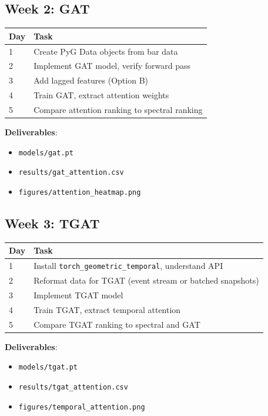 \documentclass[11pt, a4paper]{article}
\begin{document}
\subsection{Week 2: GAT}

\begin{center}
\begin{tabular}{lp{10cm}}
\toprule
\textbf{Day} & \textbf{Task} \\
\midrule
1 & Create PyG Data objects from bar data \\
2 & Implement GAT model, verify forward pass \\
3 & Add lagged features (Option B) \\
4 & Train GAT, extract attention weights \\
5 & Compare attention ranking to spectral ranking \\
\bottomrule
\end{tabular}
\end{center}

\textbf{Deliverables}:
\begin{itemize}
    \item \texttt{models/gat.pt}
    \item \texttt{results/gat\_attention.csv}
    \item \texttt{figures/attention\_heatmap.png}
\end{itemize}

\subsection{Week 3: TGAT}

\begin{center}
\begin{tabular}{lp{10cm}}
\toprule
\textbf{Day} & \textbf{Task} \\
\midrule
1 & Install \texttt{torch\_geometric\_temporal}, understand API \\
2 & Reformat data for TGAT (event stream or batched snapshots) \\
3 & Implement TGAT model \\
4 & Train TGAT, extract temporal attention \\
5 & Compare TGAT ranking to spectral and GAT \\
\bottomrule
\end{tabular}
\end{center}

\textbf{Deliverables}:
\begin{itemize}
    \item \texttt{models/tgat.pt}
    \item \texttt{results/tgat\_attention.csv}
    \item \texttt{figures/temporal\_attention.png}
\end{itemize}
\end{document}
